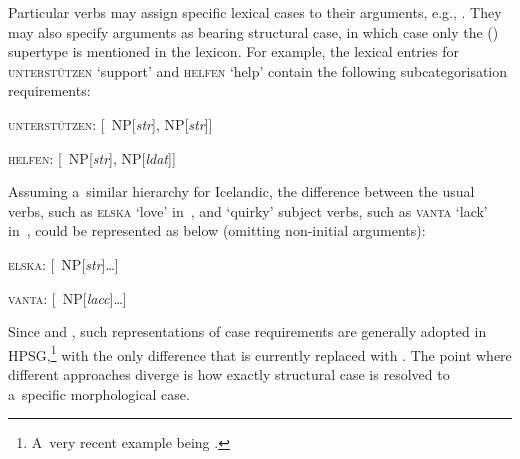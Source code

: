 \documentclass[output=paper]{langsci/langscibook}
\begin{document}
Particular verbs may assign specific lexical cases to their arguments, e.g., .  They may also specify arguments as bearing structural case, in which case only the () supertype is mentioned in the lexicon.  For example, the lexical entries for \textsc{unterst\"utzen} ‘support’ and \textsc{helfen} ‘help’ contain the following subcategorisation requirements:
\begin{examples}
\item \label{ex:hmsubcats}
  \begin{examples}
  \item \textsc{unterst\"utzen}: [~\la{}NP[\emph{str}],
    NP[\emph{str}]\ra{}] 
    \item \textsc{helfen}: [~\la{}NP[\emph{str}], NP[\emph{ldat}]\ra{}]
  \end{examples}
\end{examples}
Assuming a~similar  hierarchy for Icelandic, the difference between the usual verbs, such as \textsc{elska} ‘love’ in~, and ‘quirky’ subject verbs, such as \textsc{vanta} ‘lack’ in~, could be represented as below (omitting non-initial arguments):
\begin{examples}
\item \label{ex:islsubcats}
  \begin{examples}
  \item \textsc{elska}: [~\la{}NP[\emph{str}]…\ra{}] 
    \item \textsc{vanta}: [~\la{}NP[\emph{lacc}]…\ra{}]
  \end{examples}
\end{examples}
Since \citealt{Pollard94a} and \citealt{HM94a}, such representations of case requirements are generally adopted in HPSG,\footnote{A~very recent example being \citealt{mac:hue:18}.} with the only difference that  is currently replaced with .  The point where different approaches diverge is how exactly structural case is resolved to a~specific morphological case.
\end{document}
